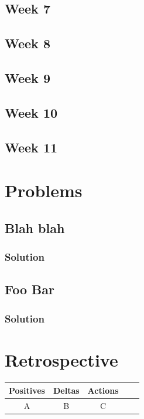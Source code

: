 \documentclass[onecolumn, draftclsnofoot,10pt, compsoc]{IEEEtran}
\begin{document}
		\subsection{Week 7}
		\subsection{Week 8}
		\subsection{Week 9}
		\subsection{Week 10}
		\subsection{Week 11}

	\section{Problems}
		\subsection{Blah blah}
			\subsubsection{Solution}
		\subsection{Foo Bar}
			\subsubsection{Solution}

	\section{Retrospective}
	\begin{tabular}{ |c|c|c|c|c| }
		\hline
		Positives & Deltas & Actions \\
		\hline
		A & B & C \\
		\hline
	\end{tabular}
\end{document}
